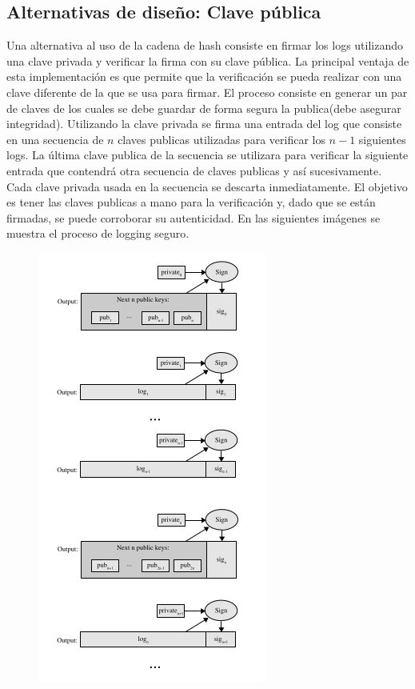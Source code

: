 \subsection{Alternativas de diseño: Clave pública}
Una alternativa al uso de la cadena de hash consiste en firmar los logs utilizando una clave privada y verificar la firma con su clave pública. La principal ventaja de esta implementación es que permite que la verificación se pueda realizar con una clave diferente de la que se usa para firmar. 
El proceso consiste en generar un par de claves de los cuales se debe guardar de forma segura la publica(debe asegurar integridad). Utilizando la clave privada se firma una entrada del log que consiste en una secuencia de $n$ claves publicas utilizadas para verificar los $n-1$ siguientes logs. La última clave publica de la secuencia se utilizara para verificar la siguiente entrada que contendrá otra secuencia de claves publicas y así sucesivamente. Cada clave privada usada en la secuencia se descarta inmediatamente. El objetivo es tener las claves publicas a mano para la verificación y, dado que se están firmadas, se puede corroborar su autenticidad. En las siguientes imágenes se muestra el proceso de logging seguro.
\begin{figure}[H]
\centering
\includegraphics[scale=0.4]{imagenes/PublicKey.png}
\end{figure}
